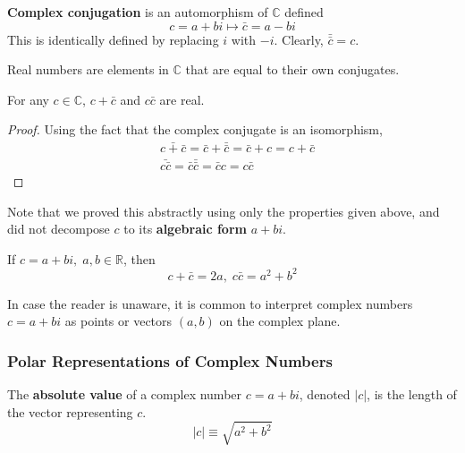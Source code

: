 \documentclass{article}
\begin{document}
    \begin{definition}
      \textbf{Complex conjugation} is an automorphism of $\mathbb{C}$ defined
      \begin{equation}
        c = a + b i \mapsto \bar{c} = a - b i
      \end{equation}
      This is identically defined by replacing $i$ with $-i$. Clearly, $\bar{\bar{c}} = c$. 
    \end{definition}

    \begin{definition}
      Real numbers are elements in $\mathbb{C}$ that are equal to their own conjugates. 
    \end{definition}

    \begin{proposition}
      For any $c \in \mathbb{C}$, $c + \bar{c}$ and $c \bar{c}$ are real. 
    \end{proposition}
    \begin{proof}
      Using the fact that the complex conjugate is an isomorphism, 
      \begin{align*}
        & \bar{c + \bar{c}} = \bar{c} + \bar{\bar{c}} = \bar{c} + c = c + \bar{c} \\
        & \bar{ c \bar{c}} = \bar{c} \bar{\bar{c}} = \bar{c} c = c \bar{c}
      \end{align*}
    \end{proof}
    Note that we proved this abstractly using only the properties given above, and did not decompose $c$ to its \textbf{algebraic form} $a + b i$. 

    If $c = a + b i, \; a, b \in \mathbb{R}$, then 
    \begin{equation}
      c + \bar{c} = 2a, \; c \bar{c} = a^2 + b^2
    \end{equation}

    In case the reader is unaware, it is common to interpret complex numbers $c = a + b i$ as points or vectors $(a, b)$ on the complex plane. 

    \subsubsection{Polar Representations of Complex Numbers}

      \begin{definition}
        The \textbf{absolute value} of a complex number $c = a + b i$, denoted $|c|$, is the length of the vector representing $c$. 
        \begin{equation}
          |c| \equiv \sqrt{a^2 + b^2}
        \end{equation}
      \end{definition}
\end{document}
